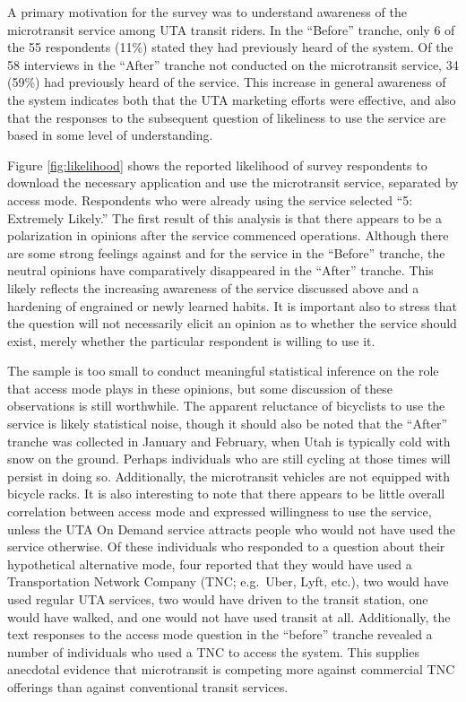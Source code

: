 \documentclass[smartcities,article,submit,moreauthors,pdftex]{Definitions/mdpi}
\begin{document}
A primary motivation for the survey was to understand awareness of the microtransit service among UTA transit riders. In the “Before” tranche, only 6 of the 55 respondents (11\%) stated they had previously heard of the system. Of the 58 interviews in the “After” tranche not conducted on the microtransit service, 34 (59\%) had previously heard of the service. This increase in general awareness of the system indicates both that the UTA marketing efforts were effective, and also that the responses to the subsequent question of likeliness to use the service are based in some level of understanding.

Figure \ref{fig:likelihood} shows the reported likelihood of survey respondents to download the necessary application and use the microtransit service, separated by access mode. Respondents who were already using the service selected “5: Extremely Likely.” The first result of this analysis is that there appears to be a polarization in opinions after the service commenced operations. Although there are some strong feelings against and for the service in the “Before” tranche, the neutral opinions have comparatively disappeared in the “After” tranche. This likely reflects the increasing awareness of the service discussed above and a hardening of engrained or newly learned habits. It is important also to stress that the question will not necessarily elicit an opinion as to whether the service should exist, merely whether the particular respondent is willing to use it.

The sample is too small to conduct meaningful statistical inference on the role that access mode plays in these opinions, but some discussion of these observations is still worthwhile. The apparent reluctance of bicyclists to use the service is likely statistical noise, though it should also be noted that the “After” tranche was collected in January and February, when Utah is typically cold with snow on the ground. Perhaps individuals who are still cycling at those times will persist in doing so. Additionally, the microtransit vehicles are not equipped with bicycle racks. It is also interesting to note that there appears to be little overall correlation between access mode and expressed willingness to use the service, unless the UTA On Demand service attracts people who would not have used the service otherwise. Of these individuals who responded to a question about their hypothetical alternative mode, four reported that they would have used a Transportation Network Company (TNC; e.g.~Uber, Lyft, etc.), two would have used regular UTA services, two would have driven to the transit station, one would have walked, and one would not have used transit at all. Additionally, the text responses to the access mode question in the “before” tranche revealed a number of individuals who used a TNC to access the system. This supplies anecdotal evidence that microtransit is competing more against commercial TNC offerings than against conventional transit services.
\end{document}
